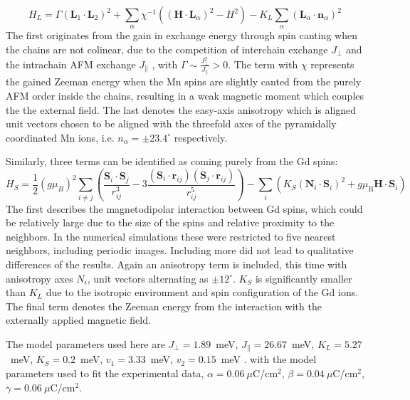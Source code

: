 \begin{equation}
	H_L = \Gamma(\mathbf{L}_1\cdot \mathbf{L}_2)^2
    +\sum_{\alpha}\chi^{-1}((\mathbf{H}\cdot \mathbf{L}_\alpha)^2-H^2)
    -K_L\sum_\alpha(\mathbf{L}_\alpha\cdot \mathbf{n}_\alpha)^2\label{eq:GdMn2O5_hami_1}
\end{equation}
The first originates from the gain in exchange energy through spin canting when the chains are not colinear, due to the competition of interchain exchange $J_\perp$ and the intrachain AFM exchange $J_\|$ \cite{Sushkov2008}, with $\Gamma\sim\frac{J_{\perp}^2}{J_\|}>0$. The term with $\chi$ represents the gained Zeeman energy when the Mn spins are slightly canted from the purely AFM order inside the chains, resulting in a weak magnetic moment which couples the the external field. The last denotes the easy-axis anisotropy which is aligned unit vectors chosen to be aligned with the threefold axes of the pyramidally coordinated Mn ions, i.e. $n_\alpha=\pm23.4^\circ$ respectively.

Similarly, three terms can be identified as coming purely from the Gd spins:
\begin{equation}
     H_S=\frac{1}{2}(g \mu_B)^2\sum_{i\neq j}\left(\frac{\mathbf{S}_i\cdot \mathbf{S}_j}{r_{ij}^3}-3\frac{(\mathbf{S}_i\cdot \mathbf{r}_{ij})(\mathbf{S}_j\cdot \mathbf{r}_{ij})}{r_{ij}^5}\right) - \sum_i\left( K_S(\mathbf{N}_i\cdot \mathbf{S}_i)^2 + g\mu_\mathrm{B} \mathbf{H} \cdot \mathbf{S}_i\right) 
\end{equation}
The first describes the magnetodipolar interaction between Gd spins, which could be relatively large due to the size of the spins and relative proximity to the neighbors. In the numerical simulations these were restricted to five nearest neighbors, including periodic images. Including more did not lead to qualitative differences of the results. Again an anisotropy term is included, this time with anisotropy axes $N_i$, unit vectors alternating as $\pm 12^\circ$. $K_S$ is significantly smaller than $K_L$ due to the isotropic environment and spin configuration of the Gd ions.
The final term denotes the Zeeman energy from the interaction with the externally applied magnetic field.

The model parameters used here are $J_\perp = 1.89$~meV, $J_\parallel = 26.67$~meV, $K_L = 5.27$~meV, $K_S = 0.2$~meV, $v_1 = 3.33$~meV, $v_2 = 0.15$~meV . 
with the model parameters used to fit the experimental data, $\alpha = 0.06\:\mu$C/cm$^2$, $\beta = 0.04\:\mu$C/cm$^2$, $\gamma = 0.06\:\mu$C/cm$^2$.


